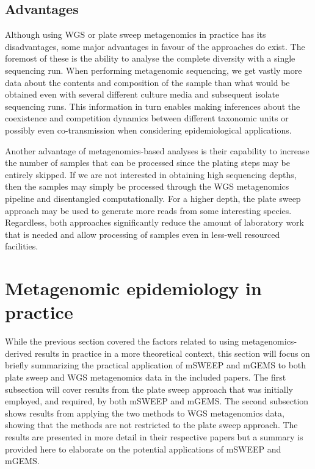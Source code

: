 \documentclass[officiallayout]{tktla}
\begin{document}
\subsection{Advantages}

Although using WGS or plate sweep metagenomics in practice has its
disadvantages, some major advantages in favour of the approaches do
exist. The foremost of these is the ability to analyse the complete
diversity with a single sequencing run. When performing metagenomic
sequencing, we get vastly more data about the contents and composition
of the sample than what would be obtained even with several different
culture media and subsequent isolate sequencing runs. This information
in turn enables making inferences about the coexistence and
competition dynamics between different taxonomic units or possibly
even co-transmission when considering epidemiological applications.

Another advantage of metagenomics-based analyses is their capability
to increase the number of samples that can be processed since the
plating steps may be entirely skipped. If we are not interested in
obtaining high sequencing depths, then the samples may simply be
processed through the WGS metagenomics pipeline and disentangled
computationally. For a higher depth, the plate sweep approach may be
used to generate more reads from some interesting species. Regardless,
both approaches significantly reduce the amount of laboratory work
that is needed and allow processing of samples even in less-well
resourced facilities.

\section{Metagenomic epidemiology in practice}

While the previous section covered the factors related to using
metagenomics-derived results in practice in a more theoretical
context, this section will focus on briefly summarizing the practical
application of mSWEEP and mGEMS to both plate sweep and WGS
metagenomics data in the included papers. The first subsection will
cover results from the plate sweep approach that was initially
employed, and required, by both mSWEEP and mGEMS. The second
subsection shows results from applying the two methods to WGS
metagenomics data, showing that the methods are not restricted to the
plate sweep approach. The results are presented in more detail in
their respective papers but a summary is provided here to elaborate on
the potential applications of mSWEEP and mGEMS.
\end{document}
